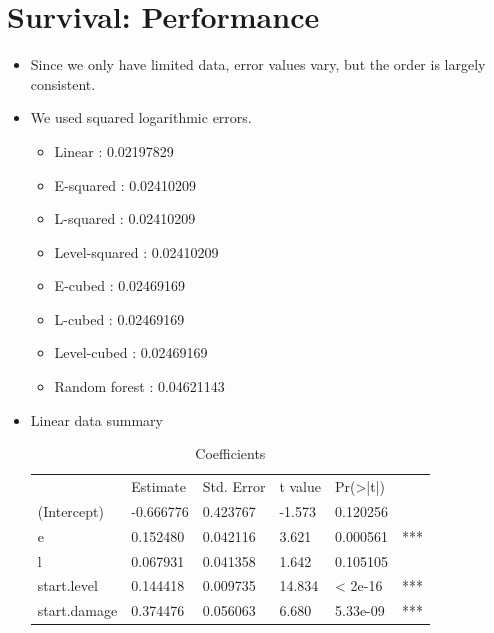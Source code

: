 \documentclass{beamer}
\begin{document}
\section{Survival: Performance}
\begin{frame}
  \begin{itemize}
  \item Since we only have limited data, error values vary, but the order is largely consistent.
  \item We used squared logarithmic errors.
    \begin{itemize}
    \item Linear : 0.02197829
    \item E-squared : 0.02410209
    \item L-squared : 0.02410209
    \item Level-squared : 0.02410209
    \item E-cubed : 0.02469169
    \item L-cubed : 0.02469169
    \item Level-cubed : 0.02469169
    \item Random forest : 0.04621143
    \end{itemize}
  \end{itemize}
\end{frame}


\begin{frame}
  \begin{itemize}
  \item Linear data summary
    \begin{table}
      \centering
      \caption{Coefficients}
      \begin{tabular}{l|lllll}
        &Estimate& Std. Error& t value& Pr(>|t|)    \\
        (Intercept)  &-0.666776&   0.423767&  -1.573& 0.120256&    \\
        e            & 0.152480&   0.042116&   3.621& 0.000561& ***\\
        l            & 0.067931&   0.041358&   1.642& 0.105105&    \\
        start.level  & 0.144418&   0.009735&  14.834&  < 2e-16& ***\\
        start.damage & 0.374476&   0.056063&   6.680& 5.33e-09& ***\\
      \end{tabular}
    \end{table}
  \end{itemize}
\end{frame}
\end{document}
